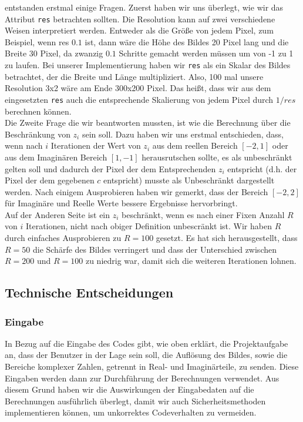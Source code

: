 \documentclass[course=erap]{aspdoc}
\begin{document}
entstanden erstmal einige Fragen. Zuerst haben wir uns überlegt, wie wir das Attribut \lstinline{res} betrachten sollten. Die Resolution kann auf zwei verschiedene Weisen interpretiert werden. Entweder als die Grö{\ss}e von jedem Pixel, zum Beispiel, wenn res $0.1$ ist, dann wäre die Höhe des Bildes 20 Pixel lang und die Breite 30 Pixel, da zwanzig $0.1$ Schritte gemacht werden m\"ussen um von -1 zu 1 zu laufen. Bei unserer Implementierung haben wir \lstinline{res} als ein Skalar des Bildes betrachtet, der die Breite und Länge multipliziert. Also, 100 mal unsere Resolution 3x2  wäre am Ende 300x200 Pixel. Das hei{\ss}t, dass wir aus dem eingesetzten \lstinline{res} auch die entsprechende Skalierung von jedem Pixel durch $1/res$ berechnen k\"onnen. \\

Die Zweite Frage die wir beantworten mussten, ist wie die Berechnung \"uber die Beschr\"ankung von $z_i$ sein soll. Dazu haben wir uns erstmal entschieden, dass, wenn nach $i$ Iterationen der Wert von $z_i$ aus dem reellen Bereich $[-2, 1]$ oder aus dem Imagin\"aren Bereich $[1, -1]$ herausrutschen sollte, es als unbeschr\"ankt gelten soll und dadurch der Pixel der dem Entsprechenden $z_i$ entspricht (d.h. der Pixel der dem gegebenen $c$ entspricht) musste als Unbeschr\"ankt dargestellt werden. Nach einigem Ausprobieren haben wir gemerkt, dass der Bereich $[-2, 2]$ f\"ur Imagin\"are und Reelle Werte bessere Ergebnisse hervorbringt. \\

Auf der Anderen Seite ist ein $z_i$ beschr\"ankt, wenn es nach einer Fixen Anzahl $R$ von $i$ Iterationen, nicht nach obiger Definition unbescr\"ankt ist. Wir haben $R$ durch einfaches Ausprobieren zu $R = 100$ gesetzt. Es hat sich herausgestellt, dass $R = 50$ die Sch\"arfe des Bildes verringert und dass der Unterschied zwischen $R = 200$ und $R = 100$ zu niedrig war, damit sich die weiteren Iterationen lohnen.

\subsection{Technische Entscheidungen}

\subsubsection{Eingabe}

In Bezug auf die Eingabe des Codes gibt, wie oben erkl\"art, die Projektaufgabe an, dass der Benutzer in der Lage sein soll, die Aufl\"osung des Bildes, sowie die Bereiche komplexer Zahlen, getrennt in Real- und Imagin\"arteile, zu senden. Diese Eingaben werden dann zur Durchf\"uhrung der Berechnungen verwendet. Aus diesem Grund haben wir die Auswirkungen der Eingabedaten auf die Berechnungen ausf\"uhrlich \"uberlegt, damit wir auch Sicherheitsmethoden implementieren k\"onnen, um unkorrektes Codeverhalten zu vermeiden. \\
\end{document}
